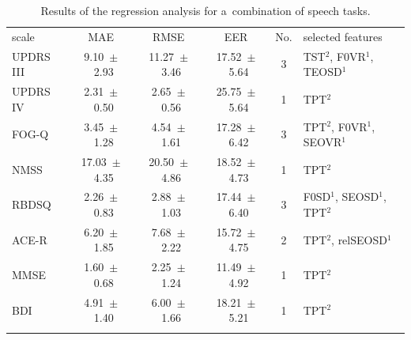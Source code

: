 \begin{table}[htb!]
	\centering
	\begin{threeparttable}
		\caption{Results of the regression analysis for a~combination of speech tasks.}
		\label{tab:ch5_classification_combination}
		\footnotesize
		\centering
		\begin{tabular}{l c c c c l}
		
			\hline\hline\noalign{\smallskip}
			\rowcolor{gray_table}
			scale & MAE & RMSE & EER & No. & selected features \\
			\noalign{\smallskip}\hline\noalign{\smallskip}
			
			UPDRS III &  9.10~$\pm$~2.93 & 11.27~$\pm$~3.46 & 17.52~$\pm$~5.64 & 3 & TST$^{2}$, F0VR$^{1}$, TEOSD$^{1}$ \\
			UPDRS IV  &  2.31~$\pm$~0.50 &  2.65~$\pm$~0.56 & 25.75~$\pm$~5.64 & 1 & TPT$^{2}$ \\
			FOG-Q     &  3.45~$\pm$~1.28 &  4.54~$\pm$~1.61 & 17.28~$\pm$~6.42 & 3 & TPT$^{2}$, F0VR$^{1}$, SEOVR$^{1}$ \\
			NMSS      & 17.03~$\pm$~4.35 & 20.50~$\pm$~4.86 & 18.52~$\pm$~4.73 & 1 & TPT$^{2}$ \\
			RBDSQ     &  2.26~$\pm$~0.83 &  2.88~$\pm$~1.03 & 17.44~$\pm$~6.40 & 3 & F0SD$^{1}$, SEOSD$^{1}$, TPT$^{2}$ \\
			ACE-R     &  6.20~$\pm$~1.85 &  7.68~$\pm$~2.22 & 15.72~$\pm$~4.75 & 2 & TPT$^{2}$, relSEOSD$^{1}$ \\
			MMSE      &  1.60~$\pm$~0.68 &  2.25~$\pm$~1.24 & 11.49~$\pm$~4.92 & 1 & TPT$^{2}$ \\
			BDI       &  4.91~$\pm$~1.40 &  6.00~$\pm$~1.66 & 18.21~$\pm$~5.21 & 1 & TPT$^{2}$ \\
			
			\noalign{\smallskip}\hline\hline
		\end{tabular}
		

\end{threeparttable}
\end{table}
